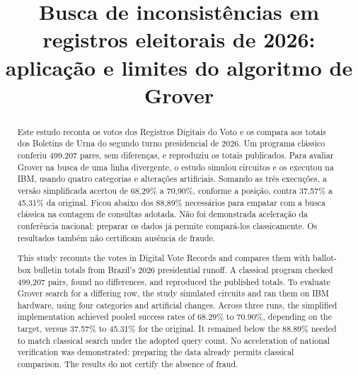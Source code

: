 \documentclass[conference]{IEEEtran}
\begin{document}
\title{Busca de inconsistências em registros eleitorais de 2026: aplicação e limites do algoritmo de Grover}
\author{
}
\maketitle
\renewcommand{\abstractname}{Resumo}
\begin{abstract}
Este estudo reconta os votos dos Registros Digitais do Voto e os compara aos totais dos Boletins de Urna do segundo turno presidencial de 2026. Um programa clássico conferiu 499.207 pares, sem diferenças, e reproduziu os totais publicados. Para avaliar Grover na busca de uma linha divergente, o estudo simulou circuitos e os executou na IBM, usando quatro categorias e alterações artificiais. Somando as três execuções, a versão simplificada acertou de 68,29\% a 70,90\%, conforme a posição, contra 37,57\% a 45,31\% da original. Ficou abaixo dos 88,89\% necessários para empatar com a busca clássica na contagem de consultas adotada. Não foi demonstrada aceleração da conferência nacional: preparar os dados já permite compará-los classicamente. Os resultados também não certificam ausência de fraude.
\end{abstract}
\begin{otherlanguage}{english}
\renewcommand{\abstractname}{Abstract}
\begin{abstract}
This study recounts the votes in Digital Vote Records and compares them with ballot-box bulletin totals from Brazil's 2026 presidential runoff. A classical program checked 499,207 pairs, found no differences, and reproduced the published totals. To evaluate Grover search for a differing row, the study simulated circuits and ran them on IBM hardware, using four categories and artificial changes. Across three runs, the simplified implementation achieved pooled success rates of 68.29\% to 70.90\%, depending on the target, versus 37.57\% to 45.31\% for the original. It remained below the 88.89\% needed to match classical search under the adopted query count. No acceleration of national verification was demonstrated: preparing the data already permits classical comparison. The results do not certify the absence of fraud.
\end{abstract}
\end{otherlanguage}
\end{document}
